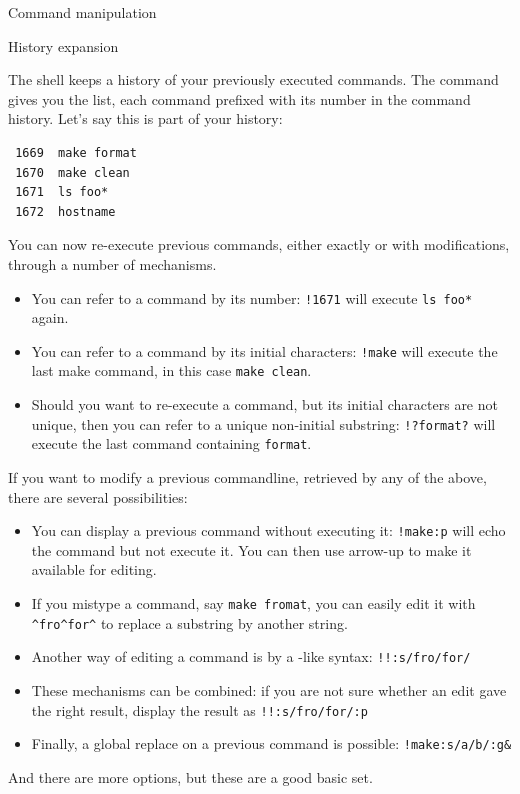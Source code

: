  {Command manipulation}

 {History expansion}

The shell keeps a history of your previously executed commands.
The command  gives you the list,
each command prefixed with its number in the command history.
Let's say this is part of your history:
\begin{lstlisting}
 1669  make format
 1670  make clean
 1671  ls foo*
 1672  hostname
\end{lstlisting}
You can now re-execute previous commands,
either exactly or with modifications,
through a number of mechanisms.
\begin{itemize}
\item You can refer to a command by its number: \lstinline+!1671+
  will execute \lstinline+ls foo*+ again.
\item You can refer to a command by its initial characters:
  \lstinline+!make+ will execute the last make command,
  in this case \lstinline+make clean+.
\item Should you want to re-execute a command, but its initial
  characters are not unique, then you can refer to a unique non-initial substring:
  \lstinline+!?format?+ will execute the last command containing \lstinline{format}.
\end{itemize}
If you want to modify a previous commandline, retrieved by any of the above,
there are several possibilities:
\begin{itemize}
\item You can display a previous command without executing it:
  \lstinline+!make:p+ will echo the command but not execute it.
  You can then use arrow-up to make it available for editing.
\item If you mistype a command, say \lstinline+make fromat+, you can easily edit
  it with \lstinline+^fro^for^+ to replace a substring by another string.
\item Another way of editing a command is by a -like syntax:
  \lstinline+!!:s/fro/for/+
\item These mechanisms can be combined: if you are not sure whether an edit
  gave the right result, display the result as \lstinline+!!:s/fro/for/:p+
\item Finally, a global replace on a previous command is possible:
  \lstinline+!make:s/a/b/:g&+
\end{itemize}
And there are more options, but these are a good basic set.

